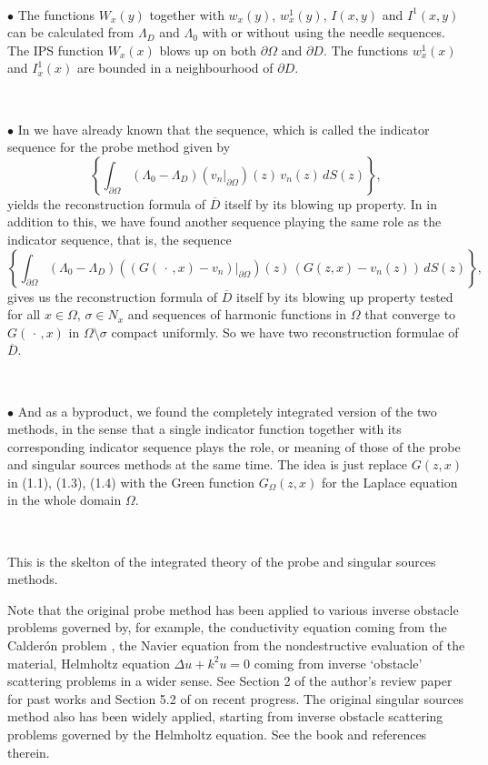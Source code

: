 $\quad$


\noindent
$\bullet$  The functions $W_x(y)$ together with $w_x(y)$, $w_x^1(y)$, $I(x,y)$ and $I^1(x,y)$ can be calculated from
$\Lambda_D$ and $\Lambda_0$ with or without using the needle sequences.  The IPS function
$W_x(x)$ blows up on both $\partial\Omega$ and $\partial D$.  The functions
$w_x^1(x)$ and $I_x^1(x)$ are bounded in a neighbourhood of $\partial D$.

$\quad$


\noindent
$\bullet$  In \cite{INew} we have already known that the sequence, which is called the indicator sequence for the probe method
given by
$$\displaystyle
\left\{\int_{\partial\Omega}(\Lambda_0-\Lambda_D)(v_n\vert_{\partial\Omega})(z)\,
v_n(z)\,dS(z)\right\},
$$
yields the reconstruction formula of $\overline{D}$ itself by its blowing up property.
In \cite{IPS} in addition to this, we have found another sequence playing the same role as the indicator sequence, that is,
the sequence
$$\displaystyle
\left\{\int_{\partial\Omega}(\Lambda_0-\Lambda_D)((G(\,\cdot\,,x)-v_n)\vert_{\partial\Omega})(z)\,
(G(z,x)-v_n(z))\,dS(z)\right\},
$$
gives  us the reconstruction formula of $\overline{D}$ itself by its blowing up property tested
for all $x\in\Omega$, $\sigma\in N_x$ and 
sequences of harmonic functions in $\Omega$ that converge to $G(\,\cdot\,,x)$ in $\Omega\setminus\sigma$ compact uniformly.
So we have two reconstruction formulae of $\overline{D}$.  

$\quad$

\noindent
$\bullet$  And as a byproduct, we found the completely integrated version of the two methods, in the sense that
a single indicator function together with its corresponding indicator sequence plays the role, or meaning of those of the probe and singular sources methods
at the same time.
The idea is just replace $G(z,x)$ in (1.1), (1.3), (1.4) with the Green function $G_{\Omega}(z,x)$ for the Laplace equation in the whole domain $\Omega$.

$\quad$




\noindent
This is the skelton of the integrated theory of the probe and singular sources methods.


Note that the original probe method has been applied to various inverse obstacle problems governed by, for example,
the conductivity equation coming from the Calder\'on problem \cite{Cal}, the Navier equation from the nondestructive evaluation
of the material, Helmholtz equation $\Delta u+k^2u=0$ coming from inverse `obstacle' scattering problems in a wider sense.  See Section 2 of the author's review paper \cite{IReview} for past works and Section 5.2 of \cite{IRevisit}
on recent progress.
The original singular sources method also has been widely applied, starting from 
inverse obstacle scattering problems governed by the Helmholtz equation.  See the book \cite{NP} and references therein.



